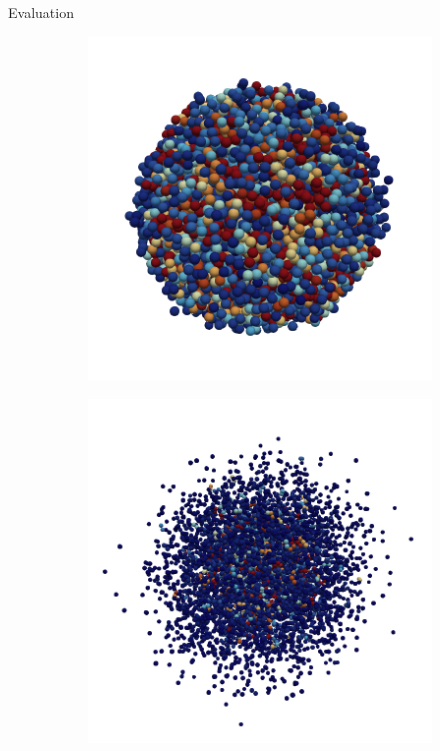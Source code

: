 \begin{frame}[c]{Evaluation}{}
{\begin{figure}[htpb]
\begin{subfigure}{.25\textwidth}
			\includegraphics[draft=false,width=\textwidth]{heating-sphere/render/t4000.png}
		\end{subfigure}%
		\begin{subfigure}{.25\textwidth}
			\includegraphics[draft=false,width=\textwidth]{heating-sphere/render/t23000.png}

\end{subfigure}
\end{figure}}
\end{frame}
